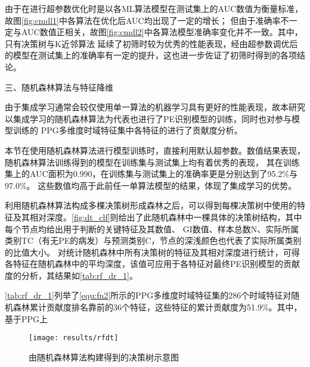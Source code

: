 由于在进行超参数优化时是以各ML算法模型在测试集上的AUC数值为衡量标准，故图\autoref{fig:cmdl1}中各算法在优化后AUC均出现了一定的增长；
但由于准确率不一定与AUC数值正相关，故图\autoref{fig:cmdl2}中各算法模型准确率变化并不一致。其中，只有决策树与K近邻算法
延续了初筛时较为优秀的性能表现，经由超参数调优后的模型在测试集上的准确率有一定的提升，这也进一步佐证了初筛时得到的各项结论。

三、随机森林算法与特征降维

由于集成学习通常会较仅使用单一算法的机器学习具有更好的性能表现，故本研究以集成学习的随机森林算法为代表也进行了PE识别模型的训练，同时也对参与模型训练的
PPG多维度时域特征集中各特征的进行了贡献度分析。

本节在使用随机森林算法进行模型训练时，直接利用默认超参数\cite{scikit-learn}。数值结果表现，随机森林算法训练得到的模型在训练集与测试集上均有着优秀的表现，
其在训练集上的AUC面积为0.990，在训练集与测试集上的准确率更是分别达到了95.2\%与97.0\%。
这些数值均高于此前任一单算法模型的结果，体现了集成学习的优势。

利用随机森林算法构成多棵决策树形成森林之后，可以得到每棵决策树中使用的特征及其相对深度。\autoref{fig:dt_clf}则给出了此随机森林中一棵具体的决策树结构，其中每个节点均给出用于判断的关键特征及其数值、
GI数值、样本总数N、实际所属类别TC（有无PE的病发）与预测类别C，节点的深浅颜色也代表了实际所属类别的比值大小。
对统计随机森林中所有决策树的特征及其相对深度进行统计，可得各特征在随机森林中的平均深度，该值可应用于各特征对最终PE识别模型的贡献度的分析，其结果如\autoref{tab:rf_dr_1}。

\autoref{tab:rf_dr_1}列举了\autoref{equ:fn2}所示的PPG多维度时域特征集的286个时域特征对随机森林累计贡献度排名靠前的36个特征，这些特征的累计贡献度为51.9\%。其中，基于PPG上

\begin{figure}[htbp]
    \centering
    \texttt{[image: results/rfdt]}
    \caption{\label{fig:dt_clf}由随机森林算法构建得到的决策树示意图}
\end{figure}


